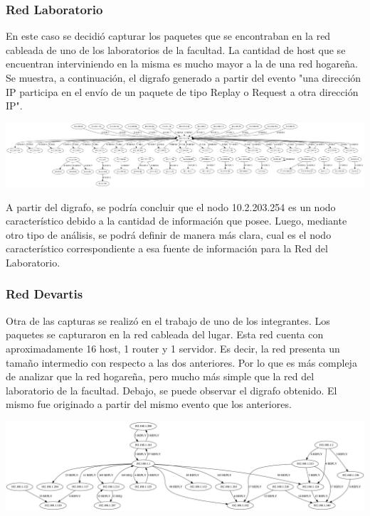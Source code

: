\subsubsection{Red Laboratorio}
En este caso se decidió capturar los paquetes que se encontraban en la red cableada de uno de los laboratorios de la facultad. La cantidad de host que se encuentran interviniendo en la misma es mucho mayor a la de una red hogareña. Se muestra, a continuación, el digrafo generado a partir del evento "una dirección IP participa en el envío de un paquete de tipo Replay o Request a otra dirección IP". 


\centerline{\includegraphics[angle=90, scale=0.3]{./graficos/grafos-arp/grafo_labo5.png}}

A partir del digrafo, se podría concluir que el nodo 10.2.203.254 es un nodo característico debido a la cantidad de información que posee. Luego, mediante otro tipo de análisis, se podrá definir de manera más clara, cual es el nodo característico correspondiente a esa fuente de información para la Red del Laboratorio. 


\subsubsection{Red Devartis}
Otra de las capturas se realizó en el trabajo de uno de los integrantes. Los paquetes se capturaron en la red cableada del lugar. Esta red cuenta con aproximadamente 16 host, 1 router y 1 servidor. Es decir, la red presenta un tamaño intermedio con respecto a las dos anteriores. Por lo que es más compleja de analizar que la red hogareña, pero mucho más simple que la red del laboratorio de la facultad. 
Debajo, se puede observar el digrafo obtenido. El mismo fue originado a partir del mismo evento que los anteriores. 

\centerline{\includegraphics[angle=90, scale=0.3]{./graficos/grafos-arp/grafo_laburo_mari.png}}


